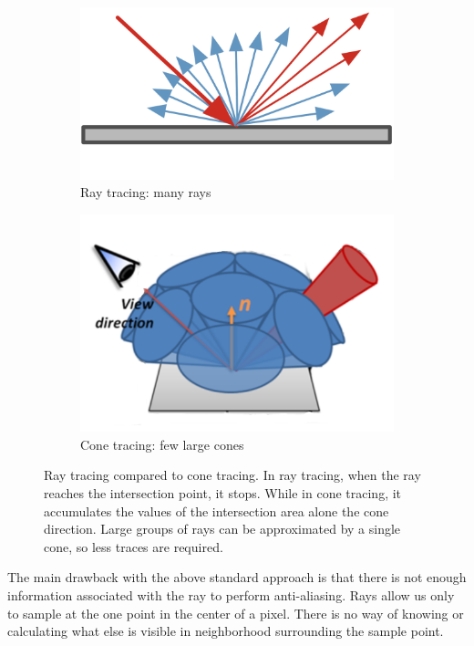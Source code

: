 \begin{figure}\label{f:ray-tracing-vs-cone-tracing}
	\begin{subfigure}[b]{0.47\textwidth}
		\includegraphics{graphics/vct/vct-1-1}
		\caption{Ray tracing: many rays}
	\end{subfigure}
	\begin{subfigure}[b]{0.53\textwidth}
		\includegraphics{graphics/vct/vct-1-2}
		\caption{Cone tracing: few large cones}
	\end{subfigure}
	\caption{Ray tracing compared to cone tracing. In ray tracing, when the ray reaches the intersection point, it stops. While in cone tracing, it accumulates the values of the intersection area alone the cone direction. Large groups of rays can be approximated by a single cone, so less traces are required.}
\end{figure}

The main drawback with the above standard approach is that there is not enough information associated with the ray to perform anti-aliasing. Rays allow us only to sample at the one point in the center of a pixel. There is no way of knowing or calculating what else is visible in neighborhood surrounding the sample point.

